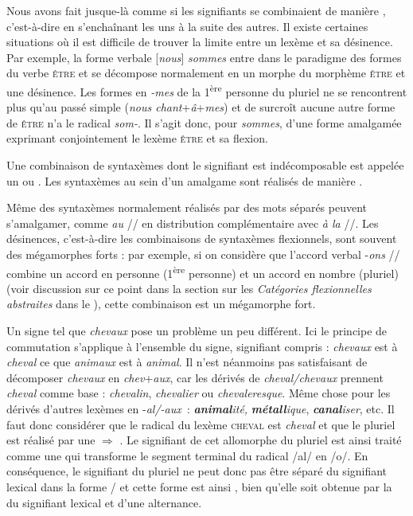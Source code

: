 Nous avons fait jusque-là comme si les signifiants se combinaient de manière , c’est-à-dire en s’enchaînant les uns à la suite des autres. Il existe certaines situations où il est difficile de trouver la limite entre un lexème et sa désinence. Par exemple, la forme verbale [\textit{nous}] \textit{sommes} entre dans le paradigme des formes du verbe \textsc{être} et se décompose normalement en un morphe du morphème \textsc{être} et une désinence. Les formes en \textit{{}-mes} de la 1\textsuperscript{ère} personne du pluriel ne se rencontrent plus qu’au passé simple (\textit{nous chant}+\textit{â}+\textit{mes}) et de surcroît aucune autre forme de \textsc{être} n’a le radical \textit{som-}. Il s’agit donc, pour \textit{sommes}, d’une forme amalgamée exprimant conjointement le lexème \textsc{être} et sa flexion.

{Une combinaison de syntaxèmes dont le signifiant est indécomposable est appelée un  ou . Les syntaxèmes au sein d’un amalgame sont réalisés de manière .}

Même des syntaxèmes normalement réalisés par des mots séparés peuvent s’amalgamer, comme \textit{au} // en distribution complémentaire avec \textit{à la} //. Les désinences, c’est-à-dire les combinaisons de syntaxèmes flexionnels, sont souvent des mégamorphes forts : par exemple, si on considère que l’accord verbal -\textit{ons} // combine un accord en personne (1\textsuperscript{ère} personne) et un accord en nombre (pluriel) (voir discussion sur ce point dans la section sur les \textit{Catégories flexionnelles abstraites} dans le ), cette combinaison est un mégamorphe fort.

Un signe tel que \textit{chevaux}  pose un problème un peu différent. Ici le principe de commutation s’applique à l’ensemble du signe, signifiant compris : \textit{chevaux} est à \textit{cheval} ce que \textit{animaux} est à \textit{animal}. Il n’est néanmoins pas satisfaisant de décomposer \textit{chevaux} en \textit{chev}+\textit{aux}, car les dérivés de \textit{cheval/chevaux} prennent \textit{cheval} comme base : \textit{chevalin}, \textit{chevalier} ou \textit{chevaleresque}. Même chose pour les dérivés d’autres lexèmes en -\textit{al/-aux~}: \textbf{\textit{animal}}\textit{ité,} \textbf{\textit{métall}}\textit{ique}, \textbf{\textit{canal}}\textit{iser}, etc. Il faut donc considérer que le radical du lexème \textsc{cheval} est \textit{cheval} et que le pluriel est réalisé par une   ${\Rightarrow}$ . Le signifiant de cet allomorphe du pluriel est ainsi traité comme une  qui transforme le segment terminal du radical /al/ en /o/. En conséquence, le signifiant du pluriel ne peut donc pas être séparé du signifiant lexical dans la forme / et cette forme est ainsi , bien qu’elle soit obtenue par la  du signifiant lexical et d’une alternance.

